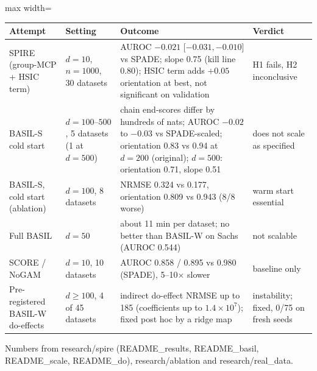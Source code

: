 \begin{adjustbox}{max width=\textwidth}
\begin{tabular}{p{2.9cm}p{3.2cm}p{6.2cm}p{2.6cm}}
\toprule
Attempt & Setting & Outcome & Verdict \\
\midrule
SPIRE (group-MCP + HSIC term) & $d=10$, $n=1000$, 30 datasets & AUROC $-0.021$ [$-0.031,-0.010$] vs SPADE; slope 0.75 (kill line 0.80); HSIC term adds $+0.05$ orientation at best, not significant on validation & H1 fails, H2 inconclusive \\
BASIL-S cold start & $d=100$--$500$, 5 datasets (1 at $d=500$) & chain end-scores differ by hundreds of nats; AUROC $-0.02$ to $-0.03$ vs SPADE-scaled; orientation 0.83 vs 0.94 at $d=200$ (original); $d=500$: orientation 0.71, slope 0.51 & does not scale as specified \\
BASIL-S, cold start (ablation) & $d=100$, 8 datasets & NRMSE 0.324 vs 0.177, orientation 0.809 vs 0.943 (8/8 worse) & warm start essential \\
Full BASIL & $d=50$ & about 11 min per dataset; no better than BASIL-W on Sachs (AUROC 0.544) & not scalable \\
SCORE / NoGAM & $d=10$, 10 datasets & AUROC 0.858 / 0.895 vs 0.980 (SPADE), 5--10$\times$ slower & baseline only \\
Pre-registered BASIL-W do-effects & $d\ge100$, 4 of 45 datasets & indirect do-effect NRMSE up to 185 (coefficients up to $1.4\times10^7$); fixed post hoc by a ridge map & instability; fixed, 0/75 on fresh seeds \\
\bottomrule
\end{tabular}
\end{adjustbox}

\smallskip
{\footnotesize Numbers from research/spire (README\_results, README\_basil, README\_scale, README\_do), research/ablation and research/real\_data.}
